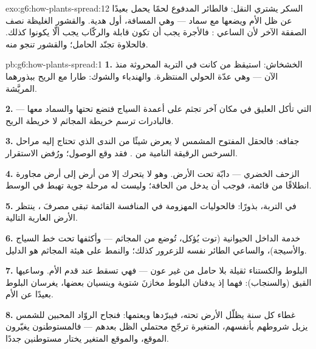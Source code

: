 \begin{solution}{exo:g6:how-plants-spread:12}
السكر يشتري النقل: فالطائر المدفوع لحمًا يحمل  بعيدًا عن ظل
الأم ويضعها مع سماد --- وهي المسافة، أول هدية. والقشور الغليظة نصف
الصفقة الآخر لأن الساعي : فالأجرة يجب أن تكون قابلة
 والركّاب يجب ألّا يكونوا كذلك. فالحلاوة تجنّد الحامل؛ والقشور
تنجو منه.
\end{solution}

\begin{solution}{pb:g6:how-plants-spread:1}
\textbf{1.} الخشخاش: استيقظ من  كانت في التربة المحروثة منذ
الآن --- وهي عدّة الحولي المنتظرة. والهندباء والشوك: طارا مع
الريح ببذورهما المريَّشة.

\textbf{2.}  التي تأكل العليق في مكان آخر تجثم على أعمدة
السياج فتضع  تحتها والسماد معها --- فالبادرات ترسم خريطة
المجاثم لا خريطة الريح.

\textbf{3.} جفافه: فالحقل المفتوح المشمس لا يعرض شيئًا من الندى
الذي تحتاج إليه مراحل السرخس الرقيقة النامية من . فقد وقع
الوصول؛ ورُفض الاستقرار.

\textbf{4.} الزحف الخضري ---  دابّة تحت الأرض. وهو لا يتحرك
إلا من أرض إلى أرض مجاورة انطلاقًا من  قائمة، فوجب أن يدخل
من الحافة؛ وليست له مرحلة جوية تهبط في الوسط.

\textbf{5.} في التربة، بذورًا: فالحوليات المهزومة في المنافسة
القائمة تبقى مصرفَ ، ينتظر الأرض العارية التالية.

\textbf{6.} خدمة الداخل الحيوانية (توت يُؤكل،  تُوضع من
المجاثم --- وأكثفها تحت خط السياج والأسيجة)، والساعي الطائر نفسه
للزعرور كذلك؛ والنمط على هيئة المجاثم هو الدليل.

\textbf{7.}  البلوط والكستناء ثقيلة بلا حامل من غير عون ---
فهي تسقط عند قدم الأم. وساعيها القيق (والسنجاب): فهما إذ يدفنان
 البلوط مخازنَ شتوية وينسيان بعضها، يغرسان البلوط بعيدًا عن
الأم.

\textbf{8.} غطاء كل سنة يظلّل الأرض تحته، فيبرّدها ويعتمها:
فنجاح الروّاد المحبين للشمس يزيل شروطهم بأنفسهم،  المتغيرة
ترجّح محتملي الظل بعدهم --- فالمستوطنون يغيّرون الموقع، والموقع
المتغير يختار مستوطنين جددًا.


\end{solution}
